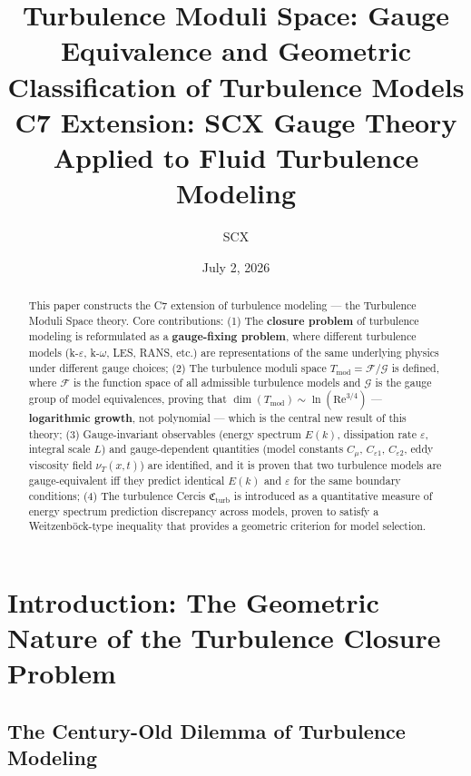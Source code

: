\documentclass[12pt,a4paper]{article}
\title{\textbf{Turbulence Moduli Space: Gauge Equivalence and Geometric
Classification of Turbulence Models}\\[0.3cm]
\large C7 Extension: SCX Gauge Theory Applied to Fluid Turbulence Modeling}
\author{SCX}
\date{July 2, 2026}
\theoremstyle{plain}
\theoremstyle{definition}
\theoremstyle{remark}
\newcommand{\F}{\mathcal{F}}
\newcommand{\G}{\mathcal{G}}
\newcommand{\cercis}{\mathfrak{C}}
\newcommand{\Tmod}{T_{\text{mod}}}
\newcommand{\ReNum}{\mathrm{Re}}
\newcommand{\eps}{\varepsilon}
\begin{document}
\maketitle

\begin{abstract}

This paper constructs the C7 extension of turbulence modeling --- the Turbulence Moduli Space theory. Core contributions: (1) The \textbf{closure problem} of turbulence modeling is reformulated as a \textbf{gauge-fixing problem}, where different turbulence models (k-$\varepsilon$, k-$\omega$, LES, RANS, etc.) are representations of the same underlying physics under different gauge choices; (2) The turbulence moduli space $\Tmod = \F/\G$ is defined, where $\F$ is the function space of all admissible turbulence models and $\G$ is the gauge group of model equivalences, proving that $\dim(\Tmod) \sim \ln(\ReNum^{3/4})$ --- \textbf{logarithmic growth}, not polynomial --- which is the central new result of this theory; (3) Gauge-invariant observables (energy spectrum $E(k)$, dissipation rate $\eps$, integral scale $L$) and gauge-dependent quantities (model constants $C_\mu$, $C_{\eps1}$, $C_{\eps2}$, eddy viscosity field $\nu_T(x,t)$) are identified, and it is proven that two turbulence models are gauge-equivalent iff they predict identical $E(k)$ and $\eps$ for the same boundary conditions; (4) The turbulence Cercis $\cercis_{\text{turb}}$ is introduced as a quantitative measure of energy spectrum prediction discrepancy across models, proven to satisfy a Weitzenb\"ock-type inequality that provides a geometric criterion for model selection.
\end{abstract}

\section{Introduction: The Geometric Nature of the Turbulence Closure Problem}

\subsection{The Century-Old Dilemma of Turbulence Modeling}
\end{document}
